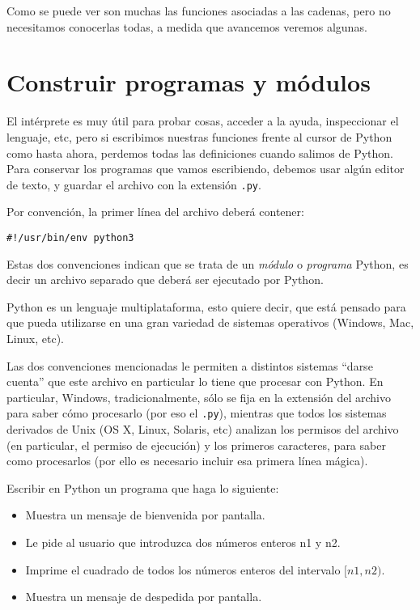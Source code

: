 Como se puede ver son muchas las funciones asociadas a las cadenas, pero no
necesitamos conocerlas todas, a medida que avancemos veremos algunas.

\section{Construir programas y módulos}

El intérprete es muy útil para probar cosas, acceder a la ayuda,
inspeccionar el lenguaje, etc, pero si escribimos nuestras funciones frente
al cursor de Python como hasta ahora, perdemos todas las definiciones
cuando salimos de Python. Para conservar los programas que vamos
escribiendo, debemos usar algún editor de texto, y guardar el archivo con
la extensión \verb+.py+.

Por convención, la primer línea del archivo deberá contener:

\begin{verbatim}
#!/usr/bin/env python3
\end{verbatim}


Estas dos convenciones indican que se trata de un {\it módulo} o {\it programa}
Python, es decir un archivo separado que deberá ser ejecutado por Python.

\begin{sabias_que}
Python es un lenguaje multiplataforma, esto quiere decir, que está pensado
para que pueda utilizarse en una gran variedad de sistemas operativos
(Windows, Mac, Linux, etc).

Las dos convenciones mencionadas le permiten a distintos sistemas ``darse
cuenta'' que este archivo en particular lo tiene que procesar con Python.
En particular, Windows, tradicionalmente, sólo se fija en la extensión del
archivo para saber cómo procesarlo (por eso el \verb!.py!), mientras que
todos los sistemas derivados de Unix (OS X, Linux, Solaris, etc) analizan
los permisos del archivo (en particular, el permiso de ejecución) y los
primeros caracteres, para saber como procesarlos (por ello es necesario
incluir esa primera línea mágica).
\end{sabias_que}

\begin{problema}
Escribir en Python un programa que haga lo siguiente:

\begin{itemize}
\item Muestra un mensaje de bienvenida por pantalla.
\item Le pide al usuario que introduzca dos números enteros n1 y n2.
\item Imprime el cuadrado de todos los números enteros del intervalo $[n1, n2)$.
\item Muestra un mensaje de despedida por pantalla.
\end{itemize}
\end{problema}

